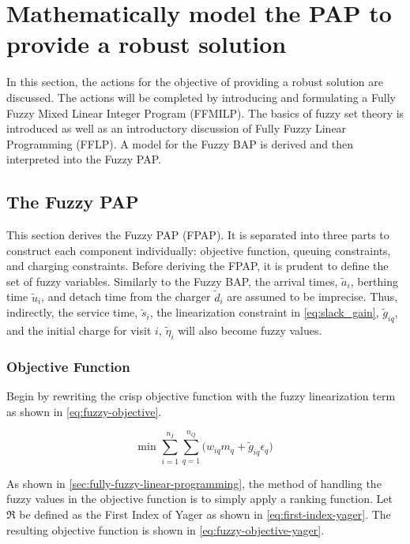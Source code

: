 \documentclass[ee,msthesis]{usuthesis}
\begin{document}
\section{Mathematically model the PAP to provide a robust solution}
\label{sec:math-model-robust}
In this section, the actions for the objective of providing a robust solution are discussed. The actions will be
completed by introducing and formulating a Fully Fuzzy Mixed Linear Integer Program (FFMILP). The basics of fuzzy set
theory is introduced as well as an introductory discussion of Fully Fuzzy Linear Programming (FFLP). A model for the
Fuzzy BAP is derived and then interpreted into the Fuzzy PAP.

\subsection{The Fuzzy PAP}
\label{sec:the-fuzzy-pap}
This section derives the Fuzzy PAP (FPAP). It is separated into three parts to construct each component individually:
objective function, queuing constraints, and charging constraints. Before deriving the FPAP, it is prudent to define the
set of fuzzy variables. Similarly to the Fuzzy BAP, the arrival times, \(\tilde{a}_i\), berthing time \(\tilde{u}_i\), and
detach time from the charger \(\tilde{d}_i\) are assumed to be imprecise. Thus, indirectly, the service time,
\(\tilde{s}_i\), the linearization constraint in \ref{eq:slack_gain}, \(\tilde{g}_{iq}\), and the initial charge for visit
\(i\), \(\tilde{\eta}_i\) will also become fuzzy values.

\subsubsection{Objective Function}
\label{sec:org6dbbf94}
Begin by rewriting the crisp objective function with the fuzzy linearization term as shown in \ref{eq:fuzzy-objective}.

\begin{equation}
\label{eq:fuzzy-objective}
\text{min } \sum_{i=1}^{n_I} \sum_{q=1}^{n_Q} \Big( w_{iq} m_q + \tilde{g}_{iq} \epsilon_{q} \Big)
\end{equation}

As shown in \ref{sec:fully-fuzzy-linear-programming}, the method of handling the fuzzy values in the objective function is to
simply apply a ranking function. Let \(\mathfrak{R}\) be defined as the First Index of Yager as shown in \ref{eq:first-index-yager}.
The resulting objective function is shown in \ref{eq:fuzzy-objective-yager}.
\end{document}

